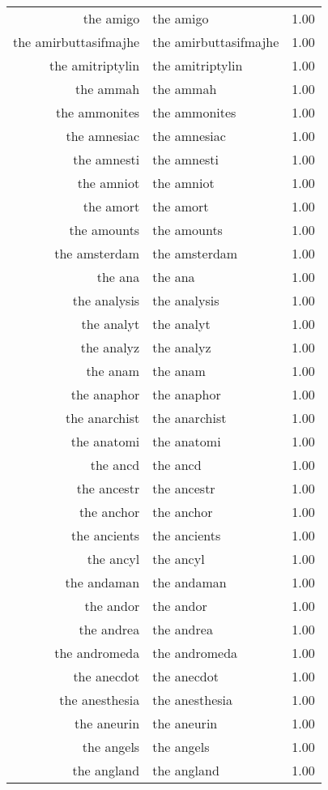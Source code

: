 \begin{table}[ht]
\begin{tabular}{rlr}
  the amigo & the amigo & 1.00 \\ 
  the amirbuttasifmajhe & the amirbuttasifmajhe & 1.00 \\ 
  the amitriptylin & the amitriptylin & 1.00 \\ 
  the ammah & the ammah & 1.00 \\ 
  the ammonites & the ammonites & 1.00 \\ 
  the amnesiac & the amnesiac & 1.00 \\ 
  the amnesti & the amnesti & 1.00 \\ 
  the amniot & the amniot & 1.00 \\ 
  the amort & the amort & 1.00 \\ 
  the amounts & the amounts & 1.00 \\ 
  the amsterdam & the amsterdam & 1.00 \\ 
  the ana & the ana & 1.00 \\ 
  the analysis & the analysis & 1.00 \\ 
  the analyt & the analyt & 1.00 \\ 
  the analyz & the analyz & 1.00 \\ 
  the anam & the anam & 1.00 \\ 
  the anaphor & the anaphor & 1.00 \\ 
  the anarchist & the anarchist & 1.00 \\ 
  the anatomi & the anatomi & 1.00 \\ 
  the ancd & the ancd & 1.00 \\ 
  the ancestr & the ancestr & 1.00 \\ 
  the anchor & the anchor & 1.00 \\ 
  the ancients & the ancients & 1.00 \\ 
  the ancyl & the ancyl & 1.00 \\ 
  the andaman & the andaman & 1.00 \\ 
  the andor & the andor & 1.00 \\ 
  the andrea & the andrea & 1.00 \\ 
  the andromeda & the andromeda & 1.00 \\ 
  the anecdot & the anecdot & 1.00 \\ 
  the anesthesia & the anesthesia & 1.00 \\ 
  the aneurin & the aneurin & 1.00 \\ 
  the angels & the angels & 1.00 \\ 
  the angland & the angland & 1.00 \\ 

\end{tabular}
\end{table}
